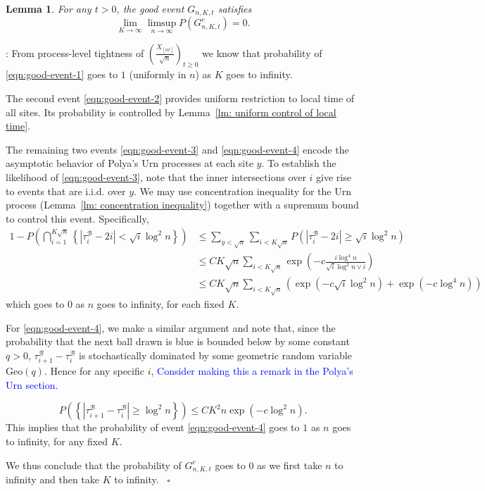 \documentclass[twoside,12pt,a4paper]{article}
\newtheorem{lemma}{Lemma}[section]
\numberwithin{equation}{section}
\newenvironment{proof}[1][Proof]{{\sc #1}:}{~\hfill $\square$}
\newcommand{\comment}[1]{\textcolor{blue}{#1}}
\begin{document}
\begin{lemma}
	\label{lem:good-event}
	For any $t > 0$, the good event $G_{n,K,t}$ satisfies
	\[
		\lim_{K \to \infty } \limsup_{n \to \infty } 
		P(G^c_{n, K,t}) = 0
	.\] 
\end{lemma}
\begin{proof}%
	From process-level tightness of $\left( \frac{X_{\left\lfloor nt  \right\rfloor}}{\sqrt{n} } \right)_{t \ge 0} $ we know that probability of \eqref{eqn:good-event-1} goes to $1$ (uniformly in $n$) as $K $ goes to infinity. 

	The second event \eqref{eqn:good-event-2} provides uniform restriction to local time of all sites. Its probability is controlled by Lemma~\ref{lm: uniform control of local time}.

	The remaining two events \eqref{eqn:good-event-3} and \eqref{eqn:good-event-4} encode the asymptotic behavior of Polya's Urn processes at each site $y$. To establish the likelihood of \eqref{eqn:good-event-3}, note that the inner intersections over $i$ give rise to events that are i.i.d. over $y$. We may use concentration inequality for the Urn process (Lemma~\ref{lm: concentration inequality}) together with a supremum bound to control this event. Specifically,
\begin{align*}
	1-P\left(\bigcap_{i = 1}^{K \sqrt{n} } \left\{\left| \tau_i^{\mathcal{B}} - 2 i \right| < \sqrt{ i } \log^2 n \right\}
\right) 
	&\le \sum_{y < \sqrt{n} }\sum_{i < K \sqrt{ n} } P\left( |\tau_i^{\mathcal{B}} - 2i| \ge \sqrt{i} \log^2 n \right) \\
	&\le CK \sqrt{n} \sum_{i < K \sqrt{ n} } \exp\left( - c \frac{i \log^4 n}{\sqrt{i}  \log^2 n \vee i} \right)  \\
	&\le CK \sqrt{n}  \sum_{i < K \sqrt{ n} }  
	\left( \exp\left( - c \sqrt{i}  \log^2 n \right)  + 
	\exp\left( - c \log^4 n \right) \right)
\end{align*}
which goes to $0$ as $n$ goes to infinity, for each fixed $K$. 

For \eqref{eqn:good-event-4}, we make a similar argument and note that, since the probability that the next ball drawn is blue is bounded below by some constant $q > 0$, $\tau_{i+1}^{\mathcal{B}} - \tau_{i}^{\mathcal{B}}$ is stochastically dominated by some geometric random variable $\text{Geo}(q)$. Hence for any specific $i$, \comment{Consider making this a remark in the Polya's Urn section.}

\[
	P\left(\left\{\left| \tau_{i+1}^{\mathcal{B}} - \tau_i^{\mathcal{B}} \right| \ge  \log^2 n \right\}\right) 
	\le C K^2 n \exp\left( - c \log^2 n \right) 
.\] 
This implies that the probability of event \eqref{eqn:good-event-4} goes to $1$ as $n$ goes to infinity, for any fixed $K$.

	We thus conclude that the probability of $G^c_{n, K, t}$ goes to $0$ as we first take $n$ to infinity and then take $K$ to infinity.
\end{proof}
\end{document}
